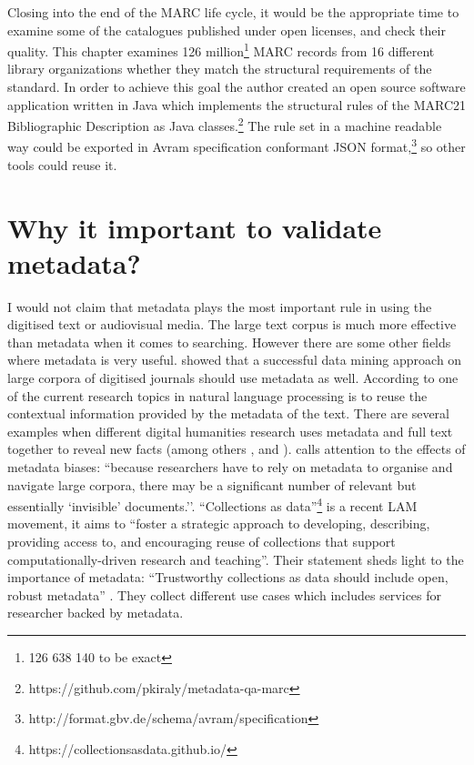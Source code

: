 Closing into the end of the MARC life cycle, it would be the appropriate time to examine some of the catalogues published under open licenses, and check their quality. This chapter examines 126 million\footnote{126 638 140 to be exact} MARC records from 16 different library organizations whether they match the structural requirements of the standard. In order to achieve this goal the author created an open source software application written in Java which implements the structural rules of the MARC21 Bibliographic Description as Java classes.\footnote{https://github.com/pkiraly/metadata-qa-marc} The rule set in a machine readable way could be exported in Avram specification conformant JSON format,\footnote{http://format.gbv.de/schema/avram/specification} so other tools could reuse it.

\section{Why it important to validate metadata?}

I would not claim that metadata plays the most important rule in using the digitised text or audiovisual media. The large text corpus is much more effective than metadata when it comes to searching. However there are some other fields where metadata is very useful. \cite{moreux2016} showed that a successful data mining approach on large corpora of digitised journals should use metadata as well. According to \cite{nanni2017} one of the current research topics in natural language processing is to reuse the contextual information provided by the metadata of the text. There are several examples when different digital humanities research uses metadata and full text together to reveal new facts (among others \cite{jockers2013}, \cite{smith2017} and \cite{lahti2019}). \cite{brown2016} calls attention to the effects of metadata biases: ``because researchers have to rely on metadata to organise and navigate large corpora, there may be a significant number of relevant but essentially `invisible’ documents.''. ``Collections as data''\footnote{https://collectionsasdata.github.io/} is a recent LAM movement, it aims to ``foster a strategic approach to developing, describing, providing access to, and encouraging reuse of collections that support computationally-driven research and teaching''.  Their statement sheds light to the importance of metadata: ``Trustworthy collections as data should include open, robust metadata'' \cite{santabarbarastatement2017}. They collect different use cases which includes services for researcher backed by metadata.

